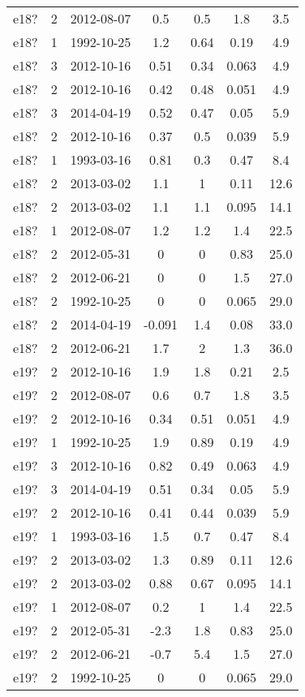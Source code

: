 \begin{table*}[htp]
\begin{tabular}{ccccccc}
e18? & 2 & 2012-08-07 & 0.5 & 0.5 & 1.8 & 3.5 \\
e18? & 1 & 1992-10-25 & 1.2 & 0.64 & 0.19 & 4.9 \\
e18? & 3 & 2012-10-16 & 0.51 & 0.34 & 0.063 & 4.9 \\
e18? & 2 & 2012-10-16 & 0.42 & 0.48 & 0.051 & 4.9 \\
e18? & 3 & 2014-04-19 & 0.52 & 0.47 & 0.05 & 5.9 \\
e18? & 2 & 2012-10-16 & 0.37 & 0.5 & 0.039 & 5.9 \\
e18? & 1 & 1993-03-16 & 0.81 & 0.3 & 0.47 & 8.4 \\
e18? & 2 & 2013-03-02 & 1.1 & 1 & 0.11 & 12.6 \\
e18? & 2 & 2013-03-02 & 1.1 & 1.1 & 0.095 & 14.1 \\
e18? & 1 & 2012-08-07 & 1.2 & 1.2 & 1.4 & 22.5 \\
e18? & 2 & 2012-05-31 & 0 & 0 & 0.83 & 25.0 \\
e18? & 2 & 2012-06-21 & 0 & 0 & 1.5 & 27.0 \\
e18? & 2 & 1992-10-25 & 0 & 0 & 0.065 & 29.0 \\
e18? & 2 & 2014-04-19 & -0.091 & 1.4 & 0.08 & 33.0 \\
e18? & 2 & 2012-06-21 & 1.7 & 2 & 1.3 & 36.0 \\
e19? & 2 & 2012-10-16 & 1.9 & 1.8 & 0.21 & 2.5 \\
e19? & 2 & 2012-08-07 & 0.6 & 0.7 & 1.8 & 3.5 \\
e19? & 2 & 2012-10-16 & 0.34 & 0.51 & 0.051 & 4.9 \\
e19? & 1 & 1992-10-25 & 1.9 & 0.89 & 0.19 & 4.9 \\
e19? & 3 & 2012-10-16 & 0.82 & 0.49 & 0.063 & 4.9 \\
e19? & 3 & 2014-04-19 & 0.51 & 0.34 & 0.05 & 5.9 \\
e19? & 2 & 2012-10-16 & 0.41 & 0.44 & 0.039 & 5.9 \\
e19? & 1 & 1993-03-16 & 1.5 & 0.7 & 0.47 & 8.4 \\
e19? & 2 & 2013-03-02 & 1.3 & 0.89 & 0.11 & 12.6 \\
e19? & 2 & 2013-03-02 & 0.88 & 0.67 & 0.095 & 14.1 \\
e19? & 1 & 2012-08-07 & 0.2 & 1 & 1.4 & 22.5 \\
e19? & 2 & 2012-05-31 & -2.3 & 1.8 & 0.83 & 25.0 \\
e19? & 2 & 2012-06-21 & -0.7 & 5.4 & 1.5 & 27.0 \\
e19? & 2 & 1992-10-25 & 0 & 0 & 0.065 & 29.0 \\

\end{tabular}
\end{table*}
